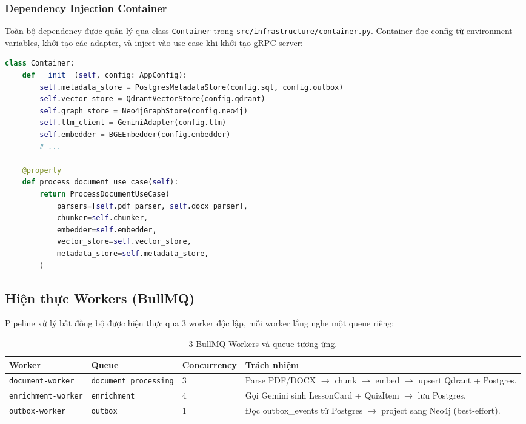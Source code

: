 \subsubsection{Dependency Injection Container}

Toàn bộ dependency được quản lý qua class \texttt{Container} trong
\texttt{src/infrastructure/container.py}. Container đọc config từ
environment variables, khởi tạo các adapter, và inject vào use case
khi khởi tạo gRPC server:

\begin{lstlisting}[language=Python, caption={Dependency Injection qua Container}]
class Container:
    def __init__(self, config: AppConfig):
        self.metadata_store = PostgresMetadataStore(config.sql, config.outbox)
        self.vector_store = QdrantVectorStore(config.qdrant)
        self.graph_store = Neo4jGraphStore(config.neo4j)
        self.llm_client = GeminiAdapter(config.llm)
        self.embedder = BGEEmbedder(config.embedder)
        # ...

    @property
    def process_document_use_case(self):
        return ProcessDocumentUseCase(
            parsers=[self.pdf_parser, self.docx_parser],
            chunker=self.chunker,
            embedder=self.embedder,
            vector_store=self.vector_store,
            metadata_store=self.metadata_store,
        )
\end{lstlisting}

\subsection{Hiện thực Workers (BullMQ)}

Pipeline xử lý bất đồng bộ được hiện thực qua 3 worker độc lập,
mỗi worker lắng nghe một queue riêng:

\begin{table}[H]
    \centering
    \caption{3 BullMQ Workers và queue tương ứng.}
    \label{tab:workers}
    \begin{tabular}{p{3.5cm}p{3cm}p{2.5cm}p{5cm}}
        \toprule
        \textbf{Worker} & \textbf{Queue} & \textbf{Concurrency} & \textbf{Trách nhiệm} \\
        \midrule
        \texttt{document-worker}
            & \texttt{document\_processing}
            & 3
            & Parse PDF/DOCX $\to$ chunk $\to$ embed $\to$
              upsert Qdrant + Postgres. \\
        \texttt{enrichment-worker}
            & \texttt{enrichment}
            & 4
            & Gọi Gemini sinh LessonCard + QuizItem $\to$
              lưu Postgres. \\
        \texttt{outbox-worker}
            & \texttt{outbox}
            & 1
            & Đọc outbox\_events từ Postgres $\to$ project
              sang Neo4j (best-effort). \\
        \bottomrule
    \end{tabular}
\end{table}

